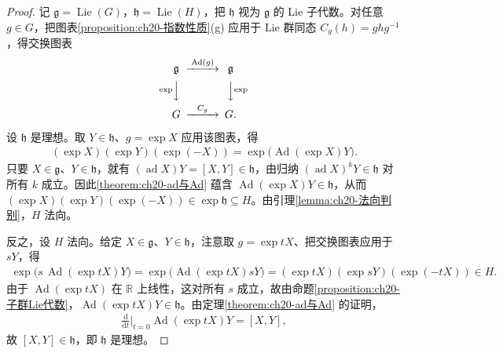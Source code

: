 \documentclass[../../main.tex]{subfiles}
\begin{document}
\begin{proof}
记 $\mathfrak g=\operatorname{Lie}(G)$，$\mathfrak h=\operatorname{Lie}(H)$，把 $\mathfrak h$ 视为 $\mathfrak g$ 的 Lie 子代数。对任意 $g\in G$，把图表\eqref{proposition:ch20-指数性质}(g) 应用于 Lie 群同态 $C_g(h)=ghg^{-1}$，得交换图表
\begin{align*}
\begin{CD}
\mathfrak g @>{\operatorname{Ad}(g)}>> \mathfrak g\\
@V{\exp}VV @VV{\exp}V\\
G @>{C_g}>> G.
\end{CD}
\end{align*}

设 $\mathfrak h$ 是理想。取 $Y\in\mathfrak h$、$g=\exp X$ 应用该图表，得
\begin{align*}
(\exp X)(\exp Y)(\exp(-X))=\exp\bigl(\operatorname{Ad}(\exp X)Y\bigr).
\end{align*}
只要 $X\in\mathfrak g$、$Y\in\mathfrak h$，就有 $(\operatorname{ad}X)Y=[X,Y]\in\mathfrak h$，由归纳 $(\operatorname{ad}X)^kY\in\mathfrak h$ 对所有 $k$ 成立。因此\eqref{theorem:ch20-ad与Ad} 蕴含 $\operatorname{Ad}(\exp X)Y\in\mathfrak h$，从而 $(\exp X)(\exp Y)(\exp(-X))\in\exp\mathfrak h\subseteq H$。由引理\cref{lemma:ch20-法向判别}，$H$ 法向。

反之，设 $H$ 法向。给定 $X\in\mathfrak g$、$Y\in\mathfrak h$，注意取 $g=\exp tX$、把交换图表应用于 $sY$，得
\begin{align*}
\exp\bigl(s\,\operatorname{Ad}(\exp tX)Y\bigr)=\exp\bigl(\operatorname{Ad}(\exp tX)sY\bigr)=(\exp tX)(\exp sY)(\exp(-tX))\in H.
\end{align*}
由于 $\operatorname{Ad}(\exp tX)$ 在 $\mathbb{R}$ 上线性，这对所有 $s$ 成立，故由命题\cref{proposition:ch20-子群Lie代数}，$\operatorname{Ad}(\exp tX)Y\in\mathfrak h$。由定理\cref{theorem:ch20-ad与Ad} 的证明，
\begin{align*}
\frac{\mathrm{d}}{\mathrm{d}t}\bigg|_{t=0}\operatorname{Ad}(\exp tX)Y=[X,Y],
\end{align*}
故 $[X,Y]\in\mathfrak h$，即 $\mathfrak h$ 是理想。
\end{proof}
\end{document}
